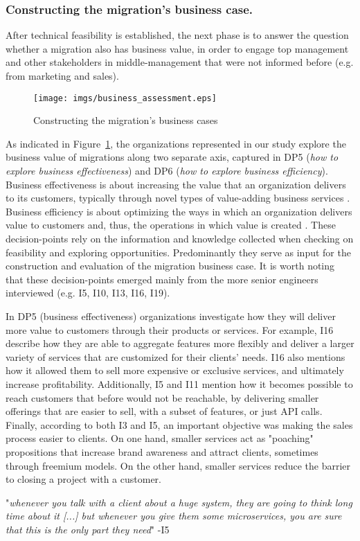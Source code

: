 \documentclass[sigconf,dvipsnames]{acmart}
\newcommand{\interviewquote}[2]{
 \def\FrameCommand{%
    \hspace{0pt}%
    {\color{MidnightBlue}\vrule width 1.5pt}%
    {\color{white}\vrule width 4pt}%
    \colorbox{white}
  }%
  \MakeFramed{\advance\hsize-\width\FrameRestore}%
  \noindent\hspace{-4.55pt}%
  \footnotesize{"\emph{#1}" -{#2}}\vspace{0.5pt}\endMakeFramed%
}
\begin{document}
\subsubsection{Constructing the migration's business case.}
After technical feasibility is established, the next phase is to answer the question whether a migration also has business value, in order to engage top management and other stakeholders in middle-management that were not informed before (e.g. from marketing and sales).

\begin{figure}[h!]
  \centering
  \texttt{[image: imgs/business\_assessment.eps]}
  \caption{Constructing the migration's business cases}
  \label{fig:organizational2}
\end{figure}

As indicated in Figure~\ref{fig:organizational2}, the organizations represented in our study explore the business value of migrations along two separate axis, captured in DP5 (\emph{how to explore business effectiveness}) and DP6 (\emph{how to explore business efficiency}). Business effectiveness is about increasing the value that an organization delivers to its customers, typically through novel types of value-adding business services \cite{Venkatraman1986}. 
Business efficiency is about optimizing the ways in which an organization delivers value to customers and, thus, the operations in which value is created \cite{Venkatraman1999}.
These decision-points rely on the information and knowledge collected when checking on feasibility and exploring opportunities. Predominantly they serve as input for the construction and evaluation of the migration business case. It is worth noting that these decision-points emerged mainly from the more senior engineers interviewed (e.g. I5, I10, I13, I16, I19).


In DP5 (business effectiveness) organizations investigate how they will deliver more value to customers through their products or services.
For example, I16 describe how they are able to aggregate features more flexibly and deliver a larger variety of services that are customized for their clients' needs. 
I16 also mentions how it allowed them to sell more expensive or exclusive services, and ultimately increase profitability.
Additionally, I5 and I11 mention how it becomes possible to reach customers that before would not be reachable, by delivering smaller offerings that are easier to sell, with a subset of features, or just API calls. 
Finally, according to both I3 and I5, an important objective was making the sales process easier to clients. On one hand, smaller services act as "poaching" propositions that increase brand awareness and attract clients, sometimes through freemium models. On the other hand, smaller services reduce the barrier to closing a project with a customer.
\interviewquote{whenever you talk with a client about a huge system, they are going to think long time about it [...] but whenever you give them some microservices, you are sure that this is the only part they need}{I5} 
\end{document}
